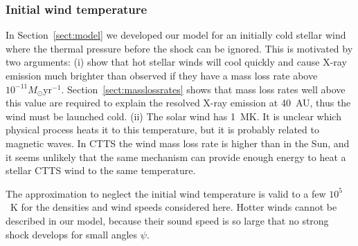 \subsubsection{Initial wind temperature}
\label{sect:T_0}
In Section~\ref{sect:model} we developed our model for an initially cold stellar wind where the thermal pressure before the shock can be ignored. This is motivated by two arguments: (i) \citet{2007IAUS..243..299M} show that hot stellar winds will cool quickly and cause X-ray emission much brighter than observed if they have a mass loss rate above $10^{-11}M_\odot\mathrm{ yr}^{-1}$. Section~\ref{sect:masslossrates} shows that mass loss rates well above this value are required to explain the resolved X-ray emission at 40~AU, thus the wind must be launched cold. (ii) The solar wind has 1~MK. It is unclear which physical process heats it to this temperature, but it is probably related to magnetic waves. In CTTS the wind mass loss rate is higher than in the Sun, and it seems unlikely that the same mechanism can provide enough energy to heat a stellar CTTS wind to the same temperature.

The approximation to neglect the initial wind temperature is valid to a few $10^5$~K for the densities and wind speeds considered here. Hotter winds cannot be described in our model, because their sound speed is so large that no strong shock develops for small angles $\psi$.